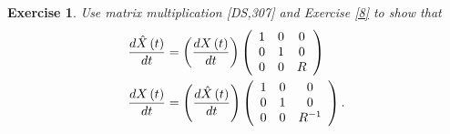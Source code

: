 \documentclass{article}%
\newtheorem{exercise}[theorem]{Exercise}
\begin{document}
\begin{exercise}
Use matrix multiplication [DS,307] and Exercise \ref{8} to show that%
\begin{align*}
\frac{d\hat{X}\left(  t\right)  }{dt}  &  =\left(  \frac{dX\left(  t\right)
}{dt}\right)  \left(
\begin{array}
[c]{ccc}%
1 & 0 & 0\\
0 & 1 & 0\\
0 & 0 & R
\end{array}
\right) \\
\frac{dX\left(  t\right)  }{dt}  &  =\left(  \frac{d\hat{X}\left(  t\right)
}{dt}\right)  \left(
\begin{array}
[c]{ccc}%
1 & 0 & 0\\
0 & 1 & 0\\
0 & 0 & R^{-1}%
\end{array}
\right)  .
\end{align*}

\end{exercise}
\end{document}
